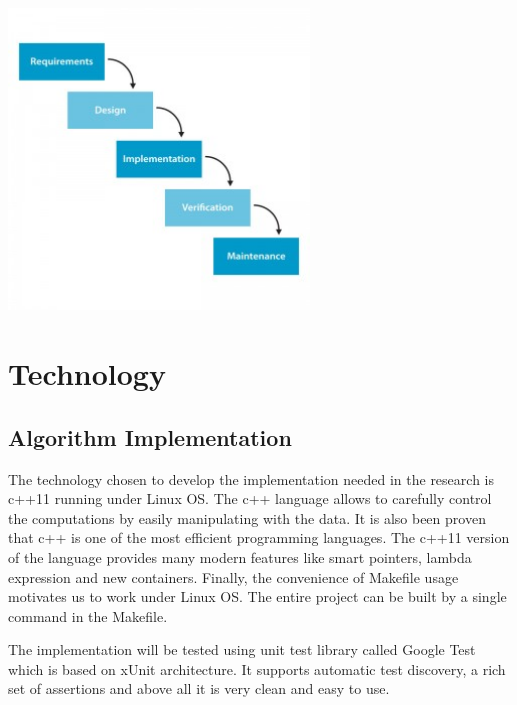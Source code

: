\documentclass{article}
\begin{document}
\begin{center}

	\includegraphics[width=80mm]{images/waterfall_model.jpg}

\end{center}


\section{Technology}

\subsection{Algorithm Implementation}

The technology chosen to develop the implementation needed in the research is c++11 running under Linux OS. The c++ language allows to carefully control the computations by easily manipulating with the data. It is also been proven that c++ is one of the most efficient programming languages. The c++11 version of the language provides many modern features like smart pointers, lambda expression and new containers. Finally, the convenience of Makefile usage motivates us to work under Linux OS. The entire project can be built by a single command in the Makefile.

The implementation will be tested using unit test library called Google Test which is based on xUnit architecture. It supports automatic test discovery, a rich set of assertions and above all it is very clean and easy to use.


\end{document}
